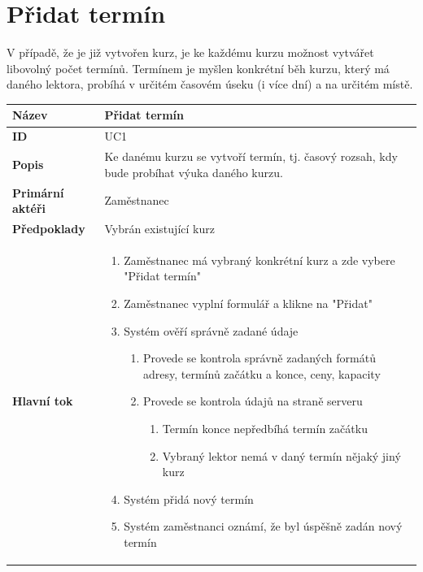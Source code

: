 \documentclass[12pt,a4paper,titlepage,final]{report}
\begin{document}
\section{Přidat termín}

V případě, že je již vytvořen kurz, je ke každému kurzu možnost vytvářet libovolný počet termínů. Termínem je myšlen konkrétní běh kurzu, který má daného lektora, probíhá v určitém časovém úseku (i více dní) a na určitém místě.

\begin{table}[h!]
	\begin{center}
    \begin{tabular}{ | p{4.2cm} | p{12.2cm} | }
    \hline
    \textbf{Název} & Přidat termín 
    \\ \hline
    
	\textbf{ID} & UC1
	\\ \hline
	
	\textbf{Popis} & Ke danému kurzu se vytvoří termín, tj. časový rozsah, kdy bude probíhat výuka daného kurzu. 
	\\ \hline
	    
	\textbf{Primární aktéři} & Zaměstnanec
	\\ \hline
	
	\textbf{Předpoklady} & Vybrán existující kurz
    \\ \hline                
    
    \textbf{Hlavní tok} &
    \vspace{-3.5mm}    
    \begin{enumerate}
    	\itemsep0em 
    	\item Zaměstnanec má vybraný konkrétní kurz a zde vybere "Přidat termín"
	    \item Zaměstnanec vyplní formulář a klikne na "Přidat"  	
	  	\item Systém ověří správně zadané údaje
	  	\begin{enumerate}
		  	\itemsep0em 
	  		\item Provede se kontrola správně zadaných formátů adresy, termínů začátku a konce, ceny, kapacity
	  		\item Provede se kontrola údajů na straně serveru
	  		\begin{enumerate}
			  	\itemsep0em 
	  			\item Termín konce nepředbíhá termín začátku
	  			\item Vybraný lektor nemá v daný termín nějaký jiný kurz
	  		\end{enumerate}
		\end{enumerate}
	    \item Systém přidá nový termín 
	    \item Systém zaměstnanci oznámí, že byl úspěšně zadán nový termín
	\end{enumerate}     
    \\ \hline
    

\end{tabular}
\end{center}
\end{table}
\end{document}
